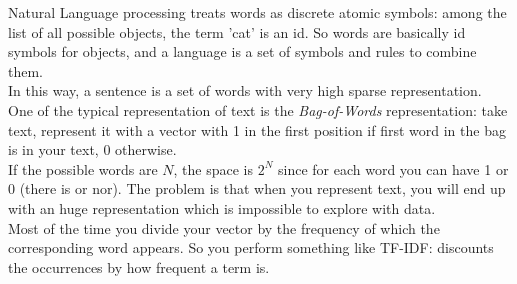 

Natural Language processing treats words as discrete atomic symbols: among the list of all possible objects, the term 'cat' is an id. So words are basically id symbols for objects, and a language is a set of symbols and rules to combine them. \\
In this way, a sentence is a set of words  with very high sparse representation. \\
One of the typical representation of  text is the \textit{Bag-of-Words} representation: take text, represent it with a vector with 1 in the first position if first word in the bag is in your text, 0 otherwise. \\
If the possible words are $N$, the space is $2^N$ since for each word you can have 1 or 0 (there is or nor). The problem is that when you represent text, you will end up with an huge representation which is impossible to explore with data. \\
Most of the time you divide your vector by the frequency of which the corresponding word appears. So you perform something like TF-IDF: discounts the occurrences by how frequent a term is. \\

